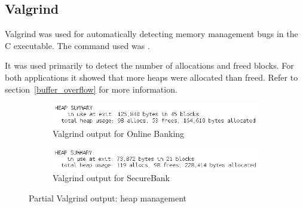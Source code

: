 \subsection{Valgrind}
Valgrind was used for automatically detecting memory management bugs in the C executable. The command used was .

It was used primarily to detect the number of allocations and freed blocks. For both applications it showed that more heaps were allocated than freed. Refer to section~\ref{buffer_overflow} for more information.

\begin{figure}[ht]
	\centering
	\begin{subfigure}{.5\textwidth}
		\centering
		\includegraphics[width=.9\linewidth]{figures/valgrind_onlinebanking.png}
		\caption{Valgrind output for Online Banking}
	\end{subfigure}%
	\begin{subfigure}{.5\textwidth}
		\centering
		\includegraphics[width=.9\linewidth]{figures/valgrind_securebank.png}
		\caption{Valgrind output for SecureBank}
	\end{subfigure}
	\caption{Partial Valgrind output: heap management}
	\label{fig:cryptoshark}
\end{figure}